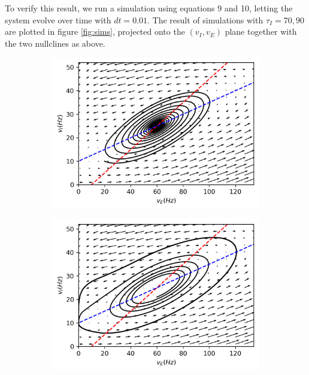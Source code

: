 \documentclass{article}
\begin{document}
To verify this result, we run a simulation using equations 9 and 10, letting the system evolve over time with $dt=0.01$. The result of simulations with $\tau_I = 70, 90$ are plotted in figure \ref{fig:sims}, projected onto the $(v_I, v_E)$ plane together with the two nullclines as above.

\begin{figure}[h]
	\centering
	\begin{subfigure}[t]{0.45\linewidth}
		\centering
		\includegraphics[width = 1.0\linewidth, trim={0 7 0 0}, clip=true]{trajectcon.png}
		\label{fig:con}	
	\end{subfigure}%
	\hspace{0.001\linewidth}
	\begin{subfigure}[t]{0.45\linewidth}
		\centering
		\includegraphics[width = 1.0\linewidth, trim={0 7 0 0}, clip=true]{trajectdiv.png}

\end{subfigure}
\end{figure}
\end{document}
